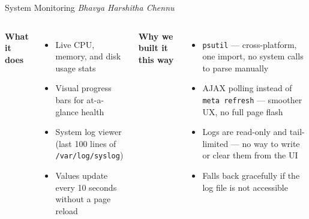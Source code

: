 \documentclass[aspectratio=169]{beamer}
\begin{document}
\begin{frame}{System Monitoring}
  \textit{Bhavya Harshitha Chennu}
  \vspace{0.5em}
  \begin{columns}[T, onlytextwidth]
      \textbf{What it does}
      \begin{itemize}
        \item Live CPU, memory, and disk usage stats
        \item Visual progress bars for at-a-glance health
        \item System log viewer (last 100 lines of \texttt{/var/log/syslog})
        \item Values update every 10 seconds without a page reload
      \end{itemize}
      \textbf{Why we built it this way}
      \begin{itemize}
        \item \texttt{psutil} --- cross-platform, one import, no system calls to parse manually
        \item AJAX polling instead of \texttt{meta refresh} --- smoother UX, no full page flash
        \item Logs are read-only and tail-limited --- no way to write or clear them from the UI
        \item Falls back gracefully if the log file is not accessible
      \end{itemize}
  \end{columns}
\end{frame}

\begin{frame}[plain]
\end{frame}
\end{document}
